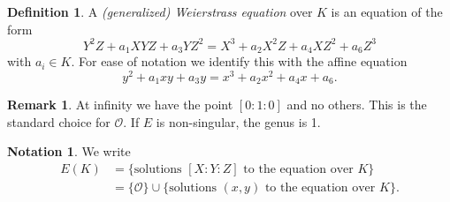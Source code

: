 \documentclass[a4paper]{article}
\theoremstyle{definition}
\newtheorem*{definition}{Definition}
\newtheorem*{notation}{Notation}
\newtheorem*{remark}{Remark}
\renewcommand{\O}{\mathcal{O}}
\begin{document}
\begin{definition}
    A \emph{(generalized) Weierstrass equation} over $K$ is an equation of the
    form
    \begin{equation*}
        Y^2Z + a_1XYZ + a_3YZ^2 = X^3 + a_2X^2Z + a_4XZ^2 + a_6Z^3
    \end{equation*}
    with $a_i\in K$. For ease of notation we identify this with the affine
    equation
    \begin{equation*}
        y^2 + a_1xy + a_3y = x^3 + a_2x^2 + a_4x + a_6.
    \end{equation*}
\end{definition}

\begin{remark}
    At infinity we have the point $[0:1:0]$ and no others. This is the standard
    choice for $\O$. If $E$ is non-singular, the genus is 1.
\end{remark}

\begin{notation}
    We write
    \begin{align*}
        E(K)
            &= \{\text{solutions $[X:Y:Z]$ to the equation over $K$}\} \\
            &= \{\O\}\cup\{\text{solutions $(x,y)$ to the equation over $K$}\}.
    \end{align*}
\end{notation}
\end{document}
